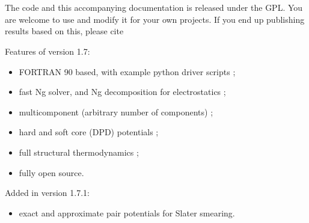\documentclass[12pt,a4paper]{article}
\begin{document}
\\[6pt]
\\[18pt]

\noindent The code and this accompanying documentation is released
under the GPL.  You are welcome to use and modify it for your own
projects. If you end up publishing results based on this, please cite\\
%
\begin{center}
\end{center}

\vspace{0.25in}
\noindent Features of version 1.7:
\begin{itemize}
\item FORTRAN 90 based, with example python driver scripts ;
\item fast Ng solver, and Ng decomposition for electrostatics ;
\item multicomponent (arbitrary number of components) ;
\item hard and soft core (DPD) potentials ;
\item full structural thermodynamics ;
\item fully open source.
\end{itemize}


\noindent Added in version 1.7.1:
\begin{itemize}
\item exact and approximate pair potentials for Slater smearing. 
\end{itemize}

\newpage
\tableofcontents
\newpage
\end{document}
